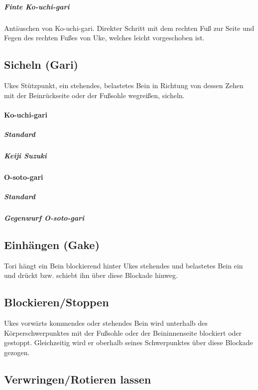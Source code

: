 \documentclass[justified, a4paper, notitlepage, captions=tableheading, nobib]{tufte-handout}
\begin{document}
\subparagraph{Finte Ko-uchi-gari}
\label{sec:org6ab194f}
Antäuschen von Ko-uchi-gari. Direkter Schritt mit dem rechten Fuß zur Seite und Fegen des rechten Fußes von Uke, welches leicht vorgeschoben ist.

\subsection{Sicheln (Gari)}
\label{sec:orgb9a2660}

Ukes Stützpunkt, ein stehendes, belastetes Bein in Richtung von dessen Zehen mit der Beinrückseite
oder der Fußsohle wegreißen, sicheln.

\paragraph{Ko-uchi-gari }
\label{sec:orgd326de1}

\subparagraph{Standard}
\label{sec:orgf10c30d}

\subparagraph{Keiji Suzuki}
\label{sec:orgf05f8d8}

\paragraph{O-soto-gari }
\label{sec:org24e7752}

\subparagraph{Standard}
\label{sec:org1af8f16}

\subparagraph{Gegenwurf O-soto-gari}
\label{sec:org6a17f25}

\subsection{Einhängen (Gake)}
\label{sec:org4ab476b}

Tori hängt ein Bein blockierend hinter Ukes stehendes und belastetes Bein ein und drückt bzw.
schiebt ihn über diese Blockade hinweg.

\subsection{Blockieren/Stoppen}
\label{sec:orga790894}

Ukes vorwärts kommendes oder stehendes Bein wird unterhalb des Körperschwerpunktes mit der
Fußsohle oder der Beininnenseite blockiert oder gestoppt. Gleichzeitig wird er oberhalb seines
Schwerpunktes über diese Blockade gezogen.

\subsection{Verwringen/Rotieren lassen}
\label{sec:org6e1c79b}
\end{document}
